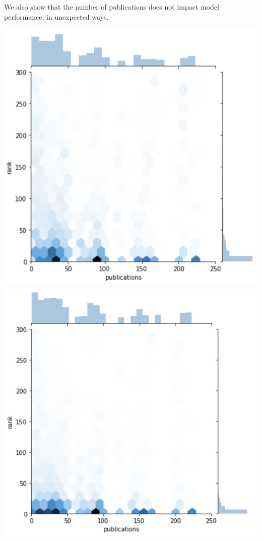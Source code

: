 \documentclass{article}
\begin{document}
\begin{multicols}{2}
We also show that the number of publications does not impact model performance, in unexpected ways.

\includegraphics[width=\columnwidth]{../images/Test_pubs.png}
\includegraphics[width=\columnwidth]{../images/Train_pubs.png}


\end{multicols}
\end{document}
